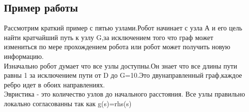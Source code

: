 \documentclass[12pt]{article}
\begin{document}
\begin{center}
   \section*{Пример работы}
\end{center}
Рассмотрим краткий пример с пятью узлами.Робот начинает с узла А и его цель найти кратчайший путь к узлу G,за исключением того что граф может измениться по мере прохождением робота или робот может получить новую информацию.\\
Изначально робот думает что все узлы доступны.Он знает что все длины пути равны 1 за исключением пути от D до G=10.Это двунаправленный граф,каждое ребро идет в обоих направлениях.\\
Эвристика - это количество узлов до начального расстояния.
Все узлы правильно локально согласованны так как g(s)=rhs(s)\\
\end{document}
